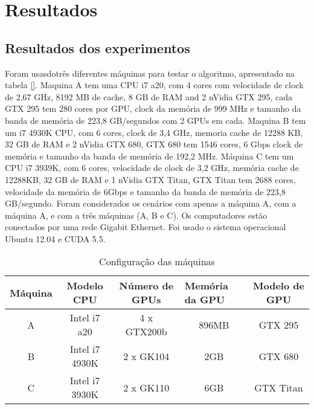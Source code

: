 \pagestyle{empty}
\cleardoublepage
\pagestyle{fancy}

\chapter{Resultados}\label{cap6}

\section{Resultados dos experimentos}\label{cap6:intro}

Foram usasdotrês diferentes máquinas para testar o algoritmo, apresentado na tabela \ref{}. Maquina A tem uma CPU i7 a20, com 4 cores com velocidade de clock de 2,67 GHz, 8192 MB de cache, 8 GB de RAM and 2 nVidia GTX 295, cada GTX 295 tem 280 cores por GPU, clock da memória de 999 MHz e tamanho da banda de memória de 223,8 GB/segundos com 2 GPUs em cada. Maquina B  tem um i7 4930K CPU, com 6 cores, clock de 3,4 GHz, memoria cache de 12288 KB, 32 GB de RAM e 2 nVidia GTX 680, GTX 680 tem 1546 cores, 6 Gbps clock de memória e tamanho da banda de memória de 192,2 MHz. Máquina C tem um CPU i7 3939K, com 6 cores, velocidade de clock de 3,2 GHz, memória cache de 12288KB, 32 GB de RAM e 1 nVidia GTX Titan, GTX Titan tem 2688 cores, velocidade da memória de 6Gbps e tamanho da banda de memória de 223,8 GB/segundo. Foram considerados os cenários com apenas a máquina A, com a máquina A, e com a três máquinas (A, B e C). Os computadores estão conectados por uma rede Gigabit Ethernet. Foi usado o sistema operacional Ubuntu 12.04 e CUDA 5.5.


\begin{table}[!t]
\centering
\tiny
\caption{Configuração das máquinas}

\begin{tabular}{|c|c|c|c|c|}
\hline
\multicolumn{1}{|l|}{Máquina} & Modelo CPU  & Número de GPUs & \multicolumn{1}{l|}{Memória da GPU } & Modelo de GPU \\ \hline
A                             & Intel i7 a20   & 4 x GTX200b         & 896MB                          & GTX 295   \\ \hline
B                             & Intel i7 4930K  & 2 x GK104           & 2GB                            & GTX 680   \\ \hline
C                             & Intel i7 3930K & 2 x GK110     & 6GB                            & GTX Titan \\ \hline
\end{tabular}
\label{table: machines}
\end{table}


